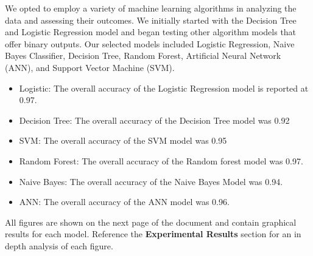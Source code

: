 \documentclass[conference]{IEEEtran}
\begin{document}
We opted to employ a variety of machine learning algorithms in analyzing the data and assessing their outcomes. We initially started with the Decision Tree and Logistic Regression model and began testing other algorithm models that offer binary outputs. Our selected models included Logistic Regression, Naive Bayes Classifier, Decision Tree, Random Forest, Artificial Neural Network (ANN), and Support Vector Machine (SVM).
\begin{itemize}
    \item Logistic: The overall accuracy of the Logistic Regression model is reported at 0.97.

    \item Decision Tree: The overall accuracy of the Decision Tree model was 0.92

    \item SVM: The overall accuracy of the SVM model was 0.95

    \item Random Forest: The overall accuracy of the Random forest model was 0.97.

    \item Naive Bayes: The overall accuracy of the Naive Bayes Model was 0.94.
    
    \item ANN: The overall accuracy of the ANN model was 0.96.
    \\

\end{itemize}
All figures are shown on the next page of the document and contain graphical results for each model. Reference the \textbf{Experimental Results} section for an in depth analysis of each figure.

\onecolumn
\end{document}
